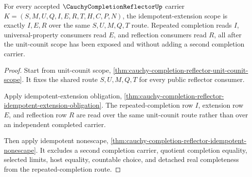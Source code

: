 \begin{theorem}
\label{thm:cauchy-completion-reflector-idempotent-scope}
For every accepted $\CauchyCompletionReflectorUp$ carrier $K=(S,M,U,Q,I,E,R,T,H,C,P,N)$, the idempotent-extension scope is exactly $I,E,R$ over the same $S,U,M,Q,T$ route. Repeated completion reads $I$, universal-property consumers read $E$, and reflection consumers read $R$, all after the unit-counit scope has been exposed and without adding a second completion carrier.
\end{theorem}
\begin{proof}
Start from unit-counit scope, \autoref{thm:cauchy-completion-reflector-unit-counit-scope}. It fixes the shared route $S,U,M,Q,T$ for every public reflector consumer.

Apply idempotent-extension obligation, \autoref{thm:cauchy-completion-reflector-idempotent-extension-obligation}. The repeated-completion row $I$, extension row $E$, and reflection row $R$ are read over the same unit-counit route rather than over an independent completed carrier.

Then apply idempotent nonescape, \autoref{thm:cauchy-completion-reflector-idempotent-nonescape}. It excludes a second completion carrier, quotient completion equality, selected limits, host equality, countable choice, and detached real completeness from the repeated-completion route.
\end{proof}

